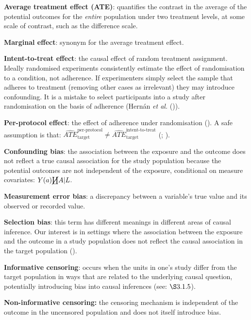 \documentclass[
  singlecolumn]{article}
\begin{document}
\textbf{Average treatment effect (ATE)}: quantifies the contrast in the
average of the potential outcomes for the \emph{entire} population under
two treatment levels, at some scale of contrast, such as the difference
scale.

\textbf{Marginal effect}: synonym for the average treatment effect.

\textbf{Intent-to-treat effect}: the causal effect of random treatment
assignment. Ideally randomised experiments consistently estimate the
effect of randomisation to a condition, not adherence. If experimenters
simply select the sample that adheres to treatment (removing other cases
as irrelevant) they may introduce confounding. It is a mistake to select
participants into a study after randomisation on the basis of adherence
(Hernán \emph{et al.} ()).

\textbf{Per-protocol effect}: the effect of adherence under
randomisation ().
A safe assumption is that:
\(\widehat{ATE}_{\text{target}}^{\text{per-protocol}} \ne \widehat{ATE}_{\text{target}}^{\text{intent-to-treat}}\)
(;
).

\textbf{Confounding bias}: the association between the exposure and the
outcome does not reflect a true causal association for the study
population because the potential outcomes are not independent of the
exposure, conditional on measure covariates: \(Y(a)\cancel\coprod A|L\).

\textbf{Measurement error bias}: a discrepancy between a variable's true
value and its observed or recorded value.

\textbf{Selection bias}: this term has different meanings in different
areas of causal inference. Our interest is in settings where the
association between the exposure and the outcome in a study population
does not reflect the causal association in the target population
().

\textbf{Informative censoring}: occurs when the units in one's study
differ from the target population in ways that are related to the
underlying causal question, potentially introducing bias into causal
inferences (see: \(\S 3.1.5\)).

\textbf{Non-informative censoring:} the censoring mechanism is
independent of the outcome in the uncensored population and does not
itself introduce bias.
\end{document}

